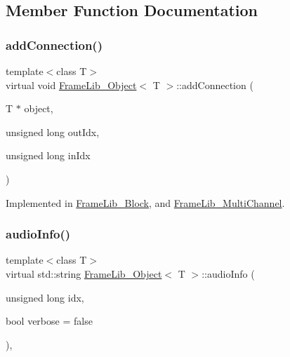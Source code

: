 \subsection{Member Function Documentation}
\mbox{\label{class_frame_lib___object_ab276c500466359bb43494ff2b7c94cc6}} 
\subsubsection{\texorpdfstring{add\+Connection()}{addConnection()}}
{\footnotesize\ttfamily template$<$class T$>$ \\
virtual void \hyperlink{class_frame_lib___object}{Frame\+Lib\+\_\+\+Object}$<$ T $>$\+::add\+Connection (\begin{DoxyParamCaption}\item[{T $\ast$}]{object,  }\item[{unsigned long}]{out\+Idx,  }\item[{unsigned long}]{in\+Idx }\end{DoxyParamCaption})\hspace{0.3cm}{\ttfamily [pure virtual]}}



Implemented in \hyperlink{class_frame_lib___block_a88e998ec661b9afd001e40e68bb52f61}{Frame\+Lib\+\_\+\+Block}, and \hyperlink{class_frame_lib___multi_channel_ab610f5adf0eb5b287a4a81806ce9b528}{Frame\+Lib\+\_\+\+Multi\+Channel}.

\mbox{\label{class_frame_lib___object_af618fcdec82b457911147c7c293bedd7}} 
\subsubsection{\texorpdfstring{audio\+Info()}{audioInfo()}}
{\footnotesize\ttfamily template$<$class T$>$ \\
virtual std\+::string \hyperlink{class_frame_lib___object}{Frame\+Lib\+\_\+\+Object}$<$ T $>$\+::audio\+Info (\begin{DoxyParamCaption}\item[{unsigned long}]{idx,  }\item[{bool}]{verbose = {\ttfamily false} }\end{DoxyParamCaption})\hspace{0.3cm}{\ttfamily [inline]}, {\ttfamily [virtual]}}



